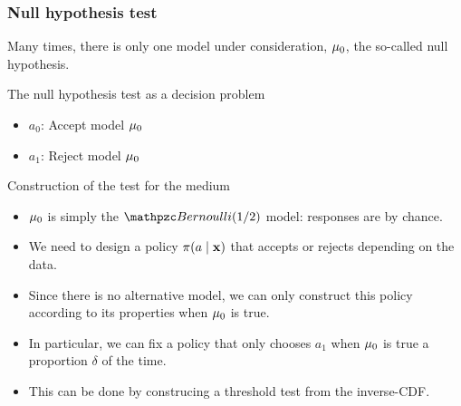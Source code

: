 \begin{frame}
  \frametitle{Null hypothesis test}
  Many times, there is only one model under consideration, $\mu_0$, the so-called \alert{null hypothesis}. 
  \begin{block}{The null hypothesis test as a decision problem}
    \begin{itemize}
    \item $a_0$: Accept model $\mu_0$
    \item $a_1$: Reject model $\mu_0$
    \end{itemize}
  \end{block}

  \begin{example}{Construction of the test for the medium}
    \begin{itemize}
    \item<2-> $\mu_0$ is simply the $\Bernoulli(1/2)$ model: responses are by chance.
    \item<3-> We need to design a policy $\pi(a \mid {\mathbf{x}})$ that accepts or rejects depending on the data.
    \item<4-> Since there is no alternative model, we can only construct this policy according to its properties when $\mu_0$ is true.
    \item<5-> In particular, we can fix a policy that only chooses $a_1$ when $\mu_0$ is true a proportion $\delta$ of the time.
    \item<6-> This can be done by construcing a threshold test from the inverse-CDF.
    \end{itemize}
  \end{example}
\end{frame}
